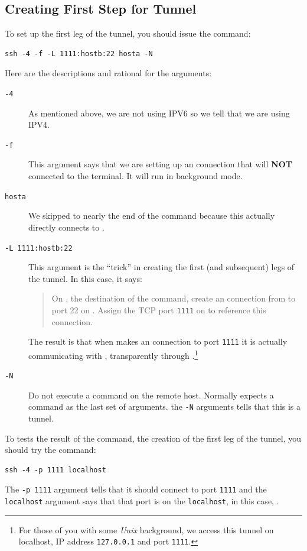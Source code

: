 \subsection{Creating First Step for Tunnel }
To set up the first leg of the tunnel, you should issue the command:
\begin{verbatim}
ssh -4 -f -L 1111:hostb:22 hosta -N
\end{verbatim}
Here are the descriptions and rational for the arguments:
\begin{description}
\item[\texttt{-4}]   As mentioned above, we are not using IPV6
  so we tell \ssh that we are using IPV4.

\item[\texttt{-f}]  This argument says that we are setting up an \ssh
  connection that will \textbf{NOT} connected to the terminal.  It
  will run in background mode.

\item[\texttt{hosta}] We skipped to nearly the end of the command
  because this \ssh actually directly connects to .

\item[\texttt{-L 1111:hostb:22}] This argument is the ``trick'' in
  creating the first (and subsequent) legs of the tunnel.  In this
  case, it says:
  \begin{quotation}
    On , the destination of the \ssh command, create an \ssh
    connection from  to port 22 on .  Assign the TCP
    port \texttt{1111}  on \textbf{\base} to reference this connection.
  \end{quotation}
  The result is that when \base makes an \ssh connection to port
  \texttt{1111} it is actually communicating with ,
  transparently through .\footnote{For those of you with some
    \textit{Unix} background, we access this tunnel on localhost, IP
    address \texttt{127.0.0.1} and port \texttt{1111}.}

\item[\texttt{-N}] Do not execute a command on the remote host.
  Normally \ssh expects a command as the last set of arguments.
  the \verb|-N| arguments tells \ssh that this is a tunnel.

\end{description}

To tests the result of the command, the creation of the first leg of
the tunnel, you should try the command:
\begin{verbatim}
ssh -4 -p 1111 localhost
\end{verbatim}
The \verb|-p 1111| argument tells \ssh that it should connect to port
\texttt{1111} and the \texttt{localhost} argument says that that port
is on the \texttt{localhost}, in this case, \base.

